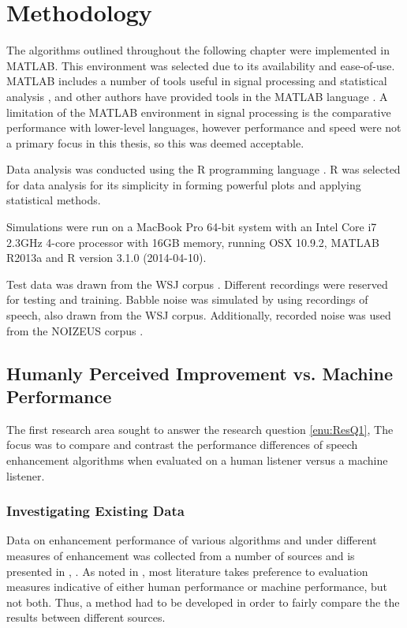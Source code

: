 
\chapter{Methodology}

\acresetall

The algorithms outlined throughout the following chapter were implemented
in MATLAB. This environment was selected due to its availability and
ease-of-use. MATLAB includes a number of tools useful in signal processing
and statistical analysis \citep{Krauss1994,Jones1997}, and other
authors have provided tools in the MATLAB language \citep{Hoyer2004,Brookes1997,Loizou2008,Wojcicki2011}.
A limitation of the MATLAB environment in signal processing is the
comparative performance with lower-level languages, however performance
and speed were not a primary focus in this thesis, so this was deemed
acceptable.

Data analysis was conducted using the R programming language \citep{RCoreTeam2014}.
R was selected for data analysis for its simplicity in forming powerful
plots and applying statistical methods.

Simulations were run on a MacBook Pro 64-bit system with an Intel
Core i7 2.3GHz 4-core processor with 16GB memory, running OSX 10.9.2,
MATLAB R2013a and R version 3.1.0 (2014-04-10).

Test data was drawn from the \ac{WSJ} corpus \citep{Robinson1995}.
Different recordings were reserved for testing and training. Babble
noise was simulated by using recordings of speech, also drawn from
the \ac{WSJ} corpus. Additionally, recorded noise was used from the
NOIZEUS corpus \citep{Hu2006}.


\section{Humanly Perceived Improvement vs. Machine Performance}

The first research area sought to answer the research question \ref{enu:ResQ1},
\textit{\RQone{}} The focus was to compare and contrast the performance
differences of speech enhancement algorithms when evaluated on a human
listener versus a machine listener.


\subsection{\label{sub:Method-Existing-Data}Investigating Existing Data}

Data on enhancement performance of various algorithms and under different
measures of enhancement was collected from a number of sources \citep{mohammadiha2013supervised,Wilson2008,Schmidt2006,Raj2005,Rennie2008,Weninger2011,Williamson2014,Paliwal2010,Plourde2007}
and is presented in , . As
noted in  \textit{},
most literature takes preference to evaluation measures indicative
of either human performance or machine performance, but not both.
Thus, a method had to be developed in order to fairly compare the
the results between different sources.

